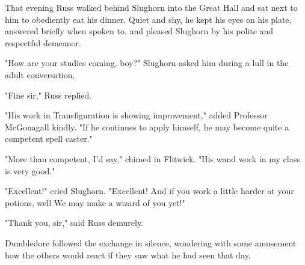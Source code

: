 That evening Russ walked behind Slughorn into the Great Hall and sat next to him to obediently eat his dinner. Quiet and shy, he kept his eyes on his plate, answered briefly when spoken to, and pleased Slughorn by his polite and respectful demeanor.

"How are your studies coming, boy?" Slughorn asked him during a lull in the adult conversation.

"Fine{\el} sir," Russ replied.

"His work in Transfiguration is showing improvement," added Professor McGonagall kindly. "If he continues to apply himself, he may become quite a competent spell caster."

"More than competent, I'd say," chimed in Flitwick. "His wand work in my class is very good."

"Excellent!" cried Slughorn. "Excellent! And if you work a little harder at your potions, well{\el} We may make a wizard of you yet!"

"Thank{\el} you, sir," said Russ demurely.

Dumbledore followed the exchange in silence, wondering with some amusement how the others would react if they saw what he had seen that day.


